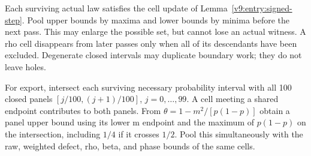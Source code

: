 Each surviving actual law satisfies the cell update of
Lemma~\ref{v9:entry:signed-step}. Pool upper bounds by maxima and lower
bounds by minima before the next pass. This may enlarge the possible
set, but cannot lose an actual witness. A rho cell disappears from later
passes only when all of its descendants have been excluded. Degenerate
closed intervals may duplicate boundary work; they do not leave holes.

For export, intersect each surviving necessary probability interval
with all 100 closed panels $[j/100,(j+1)/100]$, $j=0,\ldots,99$.
A cell meeting a shared endpoint contributes to both panels. From
$\theta=1-m^2/[p(1-p)]$ obtain a panel upper bound using its lower m
endpoint and the maximum of $p(1-p)$ on the intersection, including
$1/4$ if it crosses $1/2$. Pool this simultaneously with the raw,
weighted defect, rho, beta, and phase bounds of the same cells.

